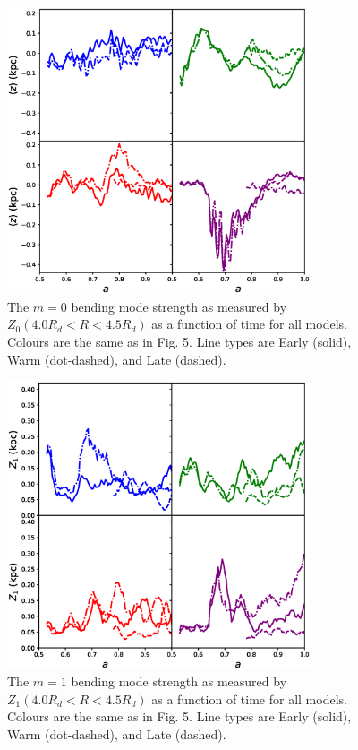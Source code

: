 \begin{figure}
	\centering
	\includegraphics[width=0.8\textwidth]{../figures/z_0_all_models_four_panel.eps}
	\caption{The $m=0$ bending mode strength as measured by $Z_0(4.0 R_d < R < 4.5 R_d)$ as a function of time for all models. Colours are the same as in Fig. 5. Line types are Early (solid), Warm (dot-dashed), and Late (dashed).} \label{fig:z_0}
\end{figure}

\begin{figure}
	\centering
	\includegraphics[width=0.8\textwidth]{../figures/z_1_all_models_four_panel.eps}
	\caption{The $m=1$ bending mode strength as measured by $Z_1(4.0 R_d < R < 4.5 R_d)$ as a function of time for all models. Colours are the same as in Fig. 5. Line types are Early (solid), Warm (dot-dashed), and Late (dashed).} \label{fig:z_1}
\end{figure}



